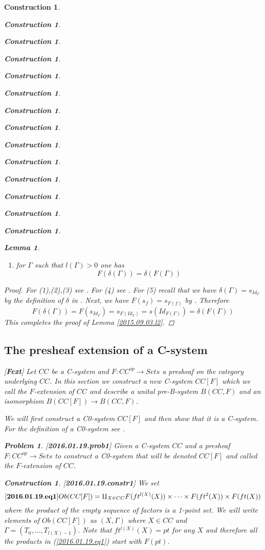 \documentclass[12pt]{amsart}
\newenvironment{eq}{\begin{equation}}{\end{equation}}
\newtheorem{lemma}[proposition]{Lemma}
\newtheorem{problem}[proposition]{Problem}
\newtheorem{construction}[proposition]{Construction}
\newcommand{\llabel}[1]{\label{#1}[{\bf #1}]}
\newcommand{\sr}{\rightarrow}
\begin{document}
\begin{construction}
\begin{construction}
\begin{construction}
\begin{construction}
\begin{construction}
\begin{construction}
\begin{construction}
\begin{construction}
\begin{construction}
\begin{construction}
\begin{construction}
\begin{construction}
\begin{construction}
\begin{construction}
\begin{lemma}
\begin{enumerate}
%
$$F(f^*(a))=(F(f))^*(F(a))$$
%
\item for $\Gamma$ such that $l(\Gamma)>0$ one has
%
$$F(\delta(\Gamma))=\delta(F(\Gamma))$$
%
\end{enumerate}
\end{lemma}
%
\begin{proof}
For (1),(2),(3) see \cite[Lemma 2.5]{fromunivwithPiI}. For (4) see \cite[Lemma 2.14]{fromunivwithPiI}. For (5) recall that we have $\delta(\Gamma)=s_{Id_{\Gamma}}$ by the definition of $\delta$ in \cite[p. 131]{Csubsystems}. Next, we have $F(s_f)=s_{F(f)}$ by \cite[Lemma 3.4]{Cfromauniverse}. Therefore
%
$$F(\delta(\Gamma))=F(s_{Id_{\Gamma}})=s_{F(Id_{\Gamma})}=s(Id_{F(\Gamma)})=\delta(F(\Gamma))$$
%
This completes the proof of Lemma \ref{2015.09.03.l2}.  
\end{proof}
%
\subsection{The presheaf extension of a C-system}
\llabel{Fext}
%
Let $CC$ be a C-system and $F:CC^{op}\sr Sets$ a presheaf on the category underlying $CC$. In this section we construct a new C-system $CC[F]$ which we call the $F$-extension of $CC$ and describe a unital pre-B-system $B(CC,F)$ and an isomorphism $B(CC[F])\sr B(CC,F)$. 

We will first construct a C0-system $CC[F]$ and then show that it is a C-system. For the definition of a C0-system see \cite[Definition 2.1]{Csubsystems}.
%
\begin{problem}\llabel{2016.01.19.prob1}
Given a C-system $CC$ and a presheaf $F:CC^{op}\sr Sets$ to construct a C0-system that will be denoted $CC[F]$ and called the $F$-extension of $CC$.
\end{problem}
%
\begin{construction}\rm\llabel{2016.01.19.constr1}
We set 
%
\begin{eq}\llabel{2016.01.19.eq1}
Ob(CC[F])=\amalg_{X\in CC} F(ft^{l(X)}(X))\times\dots\times F(ft^2(X))\times F(ft(X))
\end{eq}
%
where the product of the empty sequence of factors is a 1-point set. We will write elements of $Ob(CC[F])$ as $(X,\Gamma)$ where $X\in CC$ and $\Gamma=(T_0,\dots,T_{l(X)-1})$. Note that $ft^{l(X)}(X)=pt$ for any $X$ and therefore all the products in (\ref{2016.01.19.eq1}) start with $F(pt)$.


\end{construction}
\end{construction}
\end{construction}
\end{construction}
\end{construction}
\end{construction}
\end{construction}
\end{construction}
\end{construction}
\end{construction}
\end{construction}
\end{construction}
\end{construction}
\end{construction}
\end{construction}
\end{document}
